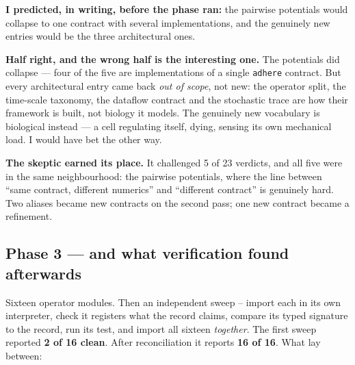 \documentclass[11pt,a4paper]{article}
\newcommand{\code}[1]{\texttt{#1}}
\begin{document}
\textbf{I predicted, in writing, before the phase ran:} the pairwise potentials would collapse to
one contract with several implementations, and the genuinely new entries would be the three
architectural ones.

\textbf{Half right, and the wrong half is the interesting one.} The potentials did collapse ---
four of the five are implementations of a single \code{adhere} contract. But every architectural
entry came back \emph{out of scope}, not new: the operator split, the time-scale taxonomy, the
dataflow contract and the stochastic trace are how their framework is built, not biology it
models. The genuinely new vocabulary is biological instead --- a cell regulating itself, dying,
sensing its own mechanical load. I would have bet the other way.

\textbf{The skeptic earned its place.} It challenged 5 of 23 verdicts, and all five were in the
same neighbourhood: the pairwise potentials, where the line between ``same contract, different
numerics'' and ``different contract'' is genuinely hard. Two aliases became new contracts on the
second pass; one new contract became a refinement.

\subsection{Phase 3 --- and what verification found afterwards}

Sixteen operator modules. Then an independent sweep -- import each in its own interpreter, check
it registers what the record claims, compare its typed signature to the record, run its test, and
import all sixteen \emph{together}. The first sweep reported \textbf{2 of 16 clean}. After
reconciliation it reports \textbf{16 of 16}. What lay between:
\end{document}
